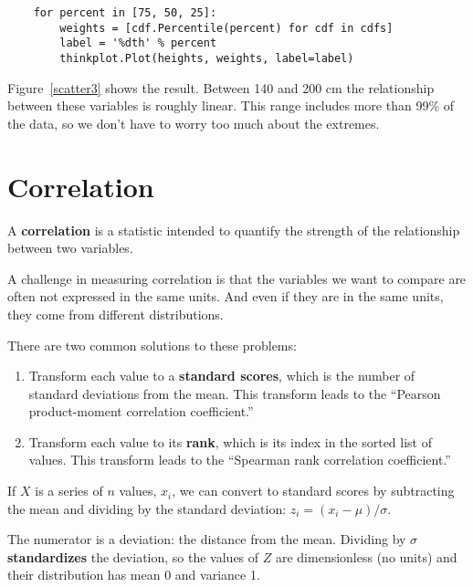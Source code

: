 \documentclass[12pt]{book}
\begin{document}
\begin{verbatim}
    for percent in [75, 50, 25]:
        weights = [cdf.Percentile(percent) for cdf in cdfs]
        label = '%dth' % percent
        thinkplot.Plot(heights, weights, label=label)
\end{verbatim}

Figure~\ref{scatter3} shows the result.  Between 140 and 200 cm
the relationship between these variables is roughly linear.  This range
includes more than 99\% of the data, so we don't have to worry
too much about the extremes.


\section{Correlation}

A {\bf correlation} is a statistic intended to quantify the strength
of the relationship between two variables.

A challenge in measuring correlation is that the variables we want to
compare are often not expressed in the same units.  And even if they
are in the same units, they come from different distributions.

There are two common solutions to these problems:

\begin{enumerate}

\item Transform each value to a {\bf standard scores}, which is the
number of standard deviations from the mean.  
This transform leads to
the ``Pearson product-moment correlation coefficient.''

\item Transform each value to its {\bf rank}, which is its index in
the sorted list of values.  This transform
leads to the ``Spearman rank correlation coefficient.''

\end{enumerate}

If $X$ is a series of $n$ values, $x_i$, we can convert to standard
scores by subtracting the mean and dividing by the standard deviation:
$z_i = (x_i - \mu) / \sigma$.

The numerator is a deviation: the distance from the mean.  Dividing by
$\sigma$ {\bf standardizes} the deviation, so the values of $Z$ are
dimensionless (no units) and their distribution has mean 0 and
variance 1.
\end{document}
